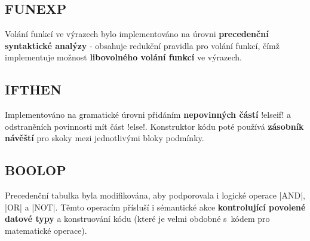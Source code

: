 \begin{multicols}{2}
\subsection{FUNEXP}
Volání funkcí ve výrazech bylo implementováno na úrovni \textbf{precedenční syntaktické analýzy}
- obsahuje redukční pravidla pro volání funkcí, čímž implementuje možnost \textbf{libovolného volání funkcí} ve výrazech.

\subsection{IFTHEN}
Implementováno na gramatické úrovni přidáním \textbf{nepovinných částí}
\ic!elseif! a odstraněních povinnosti mít část \ic!else!.
Konstruktor kódu poté používá \textbf{zásobník návěští} pro skoky mezi jednotlivými bloky podmínky.

\subsection{BOOLOP}
Precedenční tabulka byla modifikována, aby podporovala i logické operace \ic|AND|, \ic|OR| a \ic|NOT|.
Těmto operacím přísluší i sémantické akce \textbf{kontrolující povolené datové typy} a konstruování kódu (které je velmi obdobné s~kódem pro matematické operace).

\end{multicols}